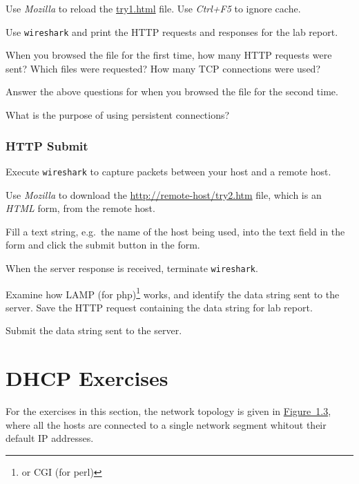 \documentclass{../UTNetLab}
\begin{document}
    Use \textit{Mozilla} to reload the \url{try1.html} file.
    Use \textit{Ctrl+F5} to ignore cache.

    Use \lstinline{wireshark} and print the HTTP requests and responses for the lab report.

    \begin{report}
        \item When you browsed the  file for the first time, how many HTTP requests were sent?
        Which files were requested?
        How many TCP connections were used?
        
        \item Answer the above questions for when you browsed the  file for the second time.
        
        \item What is the purpose of using persistent connections?
    \end{report}

\section{HTTP Submit}
    Execute \lstinline{wireshark} to capture packets between your host and a remote host.

    Use \textit{Mozilla} to download the \url{http://remote-host/try2.htm} file, which is an \textit{HTML} form, from the remote host.

    Fill a text string, e.g.\ the name of the host being used, into the text field in the form and click the submit button in the form.

    When the server response is received, terminate \lstinline{wireshark}.

    Examine how LAMP (for php)\footnote{or CGI (for perl)} works, and identify the data string sent to the server.
    Save the HTTP request containing the data string for lab report.

    \begin{report}
    \item Submit the data string sent to the server.
    \end{report}

\part{DHCP Exercises}
    For the exercises in this section, the network topology is given in \hyperref[fig:1.3]{Figure~1.3}, where all the hosts are connected to a single network segment whitout their default IP addresses.
\end{document}
